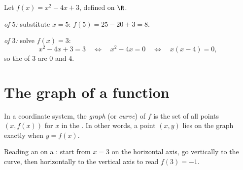\begin{example}\label{ex:g10:functions:images}
Let $f(x) = x^2 - 4x + 3$, defined on $\R$.

\emph{ of $5$:} substitute $x = 5$:
$f(5) = 25 - 20 + 3 = 8$.

\emph{ of $3$:} solve $f(x) = 3$:
\[
x^2 - 4x + 3 = 3
\quad\Longleftrightarrow\quad
x^2 - 4x = 0
\quad\Longleftrightarrow\quad
x(x - 4) = 0,
\]
so the  of $3$ are $0$ and $4$.
\end{example}

\section{The graph of a function}

\begin{definition}[Graph]\label{def:g10:functions:graph}
In a coordinate system, the \emph{graph} (or \emph{curve}) of
$f$ is the set of all points $(x, f(x))$ for $x$ in the . In other
words, a point $(x, y)$ lies on the graph exactly when $y = f(x)$.
\end{definition}

\begin{omfigure}

{\small Reading an  on a : start from $x = 3$ on the horizontal
axis, go vertically to the curve, then horizontally to the vertical axis
to read $f(3) = -1$.}
\end{omfigure}

